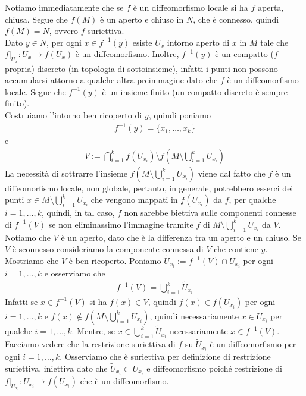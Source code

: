 \documentclass[oneside, 11pt]{amsbook}
\makeatletter
\newcommand{\wtU}{{\widetilde U}}
\newcommand{\0}{{(0)}}
\newcommand{\3}{{(3)}}
\theoremstyle{colonplain}
\theoremstyle{colondefinition}
\theoremstyle{colonremark}
\numberwithin{equation}{chapter}
\renewcommand{\proofname}{Dimostrazione}
\renewenvironment{proof}[1][\proofname]{\par
  \pushQED{\qed}%
  \normalfont \topsep6\p@\@plus6\p@\relax
  \trivlist
  \item[\hskip\labelsep\bfseries #1:]\ignorespaces
}{%
  \popQED\endtrivlist\@endpefalse
}
\makeatother
\begin{document}
\begin{proof}
    Notiamo immediatamente che se $f$ è un diffeomorfismo locale si ha $f$ aperta, chiusa. Segue che $f(M)$ è un aperto e chiuso in $N$, che è connesso, quindi $f(M) = N$, ovvero $f$ suriettiva. \\
    Dato $y \in N$, per ogni $x \in f^{-1}(y)$ esiste $U_x$ intorno aperto di $x$ in $M$ tale che $f|_{U_x} : U_x \longrightarrow f(U_x)$ è un diffeomorfismo. Inoltre, $f^{-1}(y)$ è un compatto ($f$ propria) discreto (in topologia di sottoinsieme), infatti i punti non possono accumularsi attorno a qualche altra preimmagine dato che $f$ è un diffeomorfismo locale. Segue che $f^{-1}(y)$ è un insieme finito (un compatto discreto è sempre finito). \\
    Costruiamo l'intorno ben ricoperto di $y$, quindi poniamo
    \begin{align}
        f^{-1}(y) = \{x_1, \dots, x_k\}
    \end{align}
    e
    \begin{align}
        V := \bigcap_{i = 1}^k f(U_{x_i}) \setminus f\left(M \setminus \bigcup_{i = 1}^k U_{x_i}\right)
    \end{align}
    La necessità di sottrarre l'insieme $f\left(M \setminus \bigcup_{i = 1}^k U_{x_i}\right)$ viene dal fatto che $f$ è un diffeomorfismo locale, non globale, pertanto, in generale, potrebbero esserci dei punti $x \in M \setminus \bigcup_{i = 1}^k U_{x_i}$ che vengono mappati in $f(U_{x_i})$ da $f$, per qualche $i = 1, \dots, k$, quindi, in tal caso, $f$ non sarebbe biettiva sulle componenti connesse di $f^{-1}(V)$ se non eliminassimo l'immagine tramite $f$ di $M \setminus \bigcup_{i = 1}^k U_{x_i}$ da $V$. \\
    Notiamo che $V$ è un aperto, dato che è la differenza tra un aperto e un chiuso. Se $V$ è sconnesso consideriamo la componente connessa di $V$ che contiene $y$. \\
    Mostriamo che $V$ è ben ricoperto. Poniamo $\wtU_{x_i} := f^{-1}(V) \cap U_{x_i}$ per ogni $i = 1, \dots, k$ e osserviamo che
    \begin{align}
        f^{-1}(V) = \bigcup_{i = 1}^k \wtU_{x_i}
    \end{align}
    Infatti se $x \in f^{-1}(V)$ si ha $f(x) \in V$, quindi $f(x) \in f(U_{x_i})$ per ogni $i = 1, \dots, k$ e $f(x) \not\in f\left(M \setminus \bigcup_{i = 1}^k U_{x_i}\right)$, quindi necessariamente $x \in U_{x_i}$ per qualche $i = 1, \dots, k$. Mentre, se $x \in \bigcup_{i = 1}^k \wtU_{x_i}$ necessariamente $x \in f^{-1}(V)$. \\
    Facciamo vedere che la restrizione suriettiva di $f$ su $\wtU_{x_i}$ è un diffeomorfismo per ogni $i = 1, \dots, k$. Osserviamo che è suriettiva per definizione di restrizione suriettiva, iniettiva dato che $\wtU_{x_i} \subset U_{x_i}$ e diffeomorfismo poiché restrizione di $f|_{U_{x_i}} : U_{x_i} \longrightarrow f(U_{x_i})$ che è un diffeomorfismo. 
\end{proof}
\end{document}
